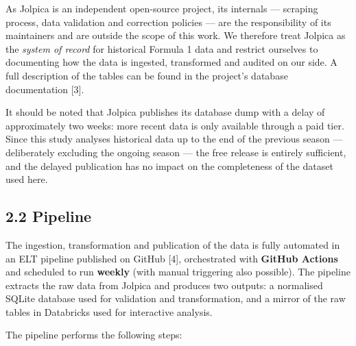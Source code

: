 \documentclass[
]{article}
\begin{document}
As Jolpica is an independent open-source project, its internals ---
scraping process, data validation and correction policies --- are the
responsibility of its maintainers and are outside the scope of this
work. We therefore treat Jolpica as the \emph{system of record} for
historical Formula 1 data and restrict ourselves to documenting how the
data is ingested, transformed and audited on our side. A full
description of the tables can be found in the project's database
documentation {[}3{]}.

It should be noted that Jolpica publishes its database dump with a delay
of approximately two weeks: more recent data is only available through a
paid tier. Since this study analyses historical data up to the end of
the previous season --- deliberately excluding the ongoing season ---
the free release is entirely sufficient, and the delayed publication has
no impact on the completeness of the dataset used here.

\subsection{2.2 Pipeline}\label{pipeline}

The ingestion, transformation and publication of the data is fully
automated in an ELT pipeline published on GitHub {[}4{]}, orchestrated
with \textbf{GitHub Actions} and scheduled to run \textbf{weekly} (with
manual triggering also possible). The pipeline extracts the raw data
from Jolpica and produces two outputs: a normalised SQLite database used
for validation and transformation, and a mirror of the raw tables in
Databricks used for interactive analysis.

The pipeline performs the following steps:
\end{document}
